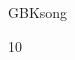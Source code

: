 \documentclass{cpbtex}
\begin{document}
\begin{CJK*}{GBK}{song}
 



\providecommand{\noopsort}[1]{}\providecommand{\singleletter}[1]{#1}%
\begin{thebibliography}{10}
\newcommand{\enquote}[1]{``#1''}


\end{thebibliography}
\end{CJK*}
\end{document}
